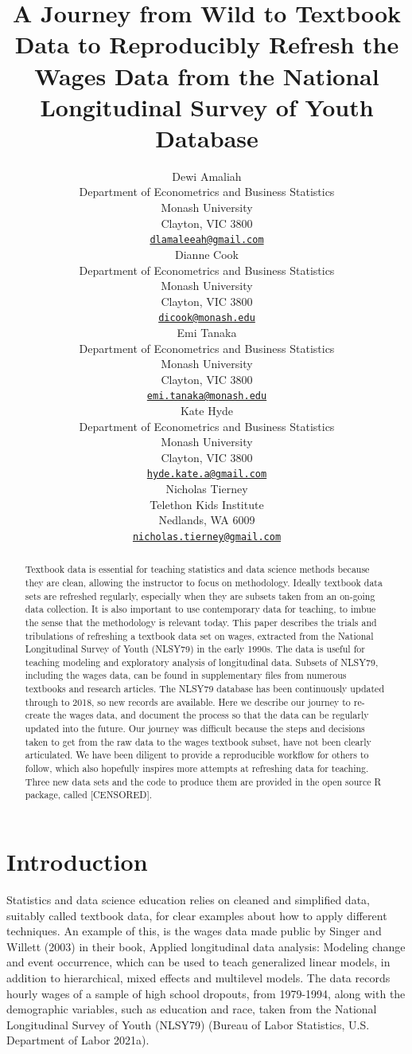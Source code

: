 \documentclass{article}
\title{A Journey from Wild to Textbook Data to Reproducibly Refresh the Wages Data from the National Longitudinal Survey of Youth Database}
\author{
    Dewi Amaliah
   \\
    Department of Econometrics and Business Statistics \\
    Monash University \\
  Clayton, VIC 3800 \\
  \texttt{\href{mailto:dlamaleeah@gmail.com}{\nolinkurl{dlamaleeah@gmail.com}}} \\
   \And
    Dianne Cook
   \\
    Department of Econometrics and Business Statistics \\
    Monash University \\
  Clayton, VIC 3800 \\
  \texttt{\href{mailto:dicook@monash.edu}{\nolinkurl{dicook@monash.edu}}} \\
   \And
    Emi Tanaka
   \\
    Department of Econometrics and Business Statistics \\
    Monash University \\
  Clayton, VIC 3800 \\
  \texttt{\href{mailto:emi.tanaka@monash.edu}{\nolinkurl{emi.tanaka@monash.edu}}} \\
   \And
    Kate Hyde
   \\
    Department of Econometrics and Business Statistics \\
    Monash University \\
  Clayton, VIC 3800 \\
  \texttt{\href{mailto:hyde.kate.a@gmail.com}{\nolinkurl{hyde.kate.a@gmail.com}}} \\
   \And
    Nicholas Tierney
   \\
    Telethon Kids Institute \\
  Nedlands, WA 6009 \\
  \texttt{\href{mailto:nicholas.tierney@gmail.com}{\nolinkurl{nicholas.tierney@gmail.com}}} \\
  }
\begin{document}
\maketitle

\def\tightlist{}


\begin{abstract}
Textbook data is essential for teaching statistics and data science methods because they are clean, allowing the instructor to focus on methodology. Ideally textbook data sets are refreshed regularly, especially when they are subsets taken from an on-going data collection. It is also important to use contemporary data for teaching, to imbue the sense that the methodology is relevant today. This paper describes the trials and tribulations of refreshing a textbook data set on wages, extracted from the National Longitudinal Survey of Youth (NLSY79) in the early 1990s. The data is useful for teaching modeling and exploratory analysis of longitudinal data. Subsets of NLSY79, including the wages data, can be found in supplementary files from numerous textbooks and research articles. The NLSY79 database has been continuously updated through to 2018, so new records are available. Here we describe our journey to re-create the wages data, and document the process so that the data can be regularly updated into the future. Our journey was difficult because the steps and decisions taken to get from the raw data to the wages textbook subset, have not been clearly articulated. We have been diligent to provide a reproducible workflow for others to follow, which also hopefully inspires more attempts at refreshing data for teaching. Three new data sets and the code to produce them are provided in the open source R package, called {[}CENSORED{]}.
\end{abstract}


\hypertarget{intro}{%
\section{Introduction}\label{intro}}

Statistics and data science education relies on cleaned and simplified data, suitably called textbook data, for clear examples about how to apply different techniques. An example of this, is the wages data made public by Singer and Willett (2003) in their book, Applied longitudinal data analysis: Modeling change and event occurrence, which can be used to teach generalized linear models, in addition to hierarchical, mixed effects and multilevel models. The data records hourly wages of a sample of high school dropouts, from 1979-1994, along with the demographic variables, such as education and race, taken from the National Longitudinal Survey of Youth (NLSY79) (Bureau of Labor Statistics, U.S. Department of Labor 2021a).
\end{document}
